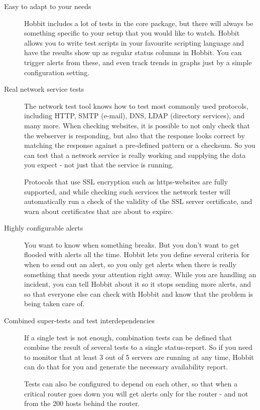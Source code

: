 \begin{description}
\item[Easy to adapt to your needs] Hobbit includes a lot of tests in
  the core package, but there will always be something specific to
  your setup that you would like to watch. Hobbit allows you to write
  test scripts in your favourite scripting language and have the
  results show up as regular status columns in Hobbit. You can trigger
  alerts from these, and even track trends in graphs just by a simple
  configuration setting. 


\item[Real network service tests] The network test tool knows how to
  test most commonly used protocols, including HTTP, SMTP (e-mail),
  DNS, LDAP (directory services), and many more. When checking
  websites, it is possible to not only check that the webserver is
  responding, but also that the response looks correct by matching the
  response against a pre-defined pattern or a checksum. So you can
  test that a network service is really working and supplying the data
  you expect - not just that the service is running. 

  Protocols that use SSL encryption such as https-websites are fully
  supported, and while checking such services the network tester will
  automatically run a check of the validity of the SSL server
  certificate, and warn about certificates that are about to expire. 

\item[Highly configurable alerts] You want to know when something
  breaks. But you don't want to get flooded with alerts all the
  time. Hobbit lets you define several criteria for when to send out
  an alert, so you only get alerts when there is really something that
  needs your attention right away. While you are handling an incident,
  you can tell Hobbit about it so it stops sending more alerts, and so
  that everyone else can check with Hobbit and know that the problem
  is being taken care of. 


\item[Combined super-tests and test interdependencies] If a single
  test is not enough, combination tests can be defined that combine
  the result of several tests to a single status-report. So if you
  need to monitor that at least 3 out of 5 servers are running at any
  time, Hobbit can do that for you and generate the necessary
  availability report. 

  Tests can also be configured to depend on each other, so that when a
  critical router goes down you will get alerts only for the router -
  and not from the 200 hosts behind the router. 

 
\end{description}

